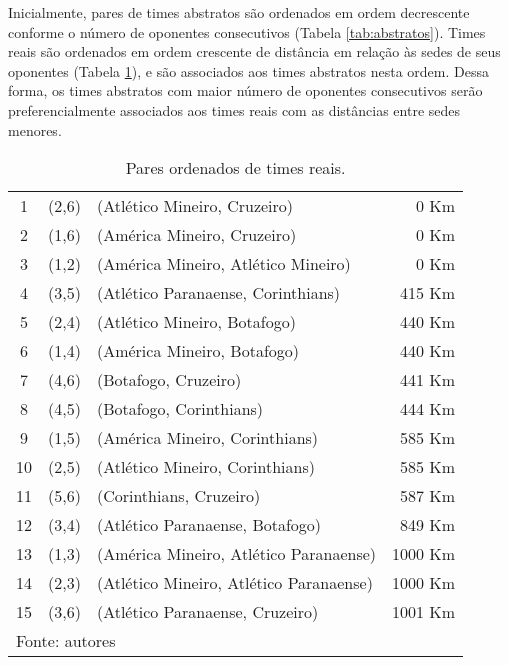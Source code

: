 \documentclass[12pt,a4paper]{article}
\renewcommand*{\arraystretch}{1.2}
\begin{document}
Inicialmente, pares de times abstratos são ordenados em ordem decrescente conforme o número de oponentes consecutivos (Tabela \ref{tab:abstratos}). Times reais são ordenados em ordem crescente de distância em relação às sedes de seus oponentes (Tabela \ref{tab:reais}), e são associados aos times abstratos nesta ordem. Dessa forma, os times abstratos com maior número de oponentes consecutivos serão preferencialmente associados aos times reais com as distâncias entre sedes menores.

\begin{table}[H]
	\renewcommand{\arraystretch}{1}
	\centering
	\caption{Pares ordenados de times reais.}
	\label{tab:reais}
	\begin{tabular}{cclr}
		\toprule
		 1 & (2,6) & (Atlético Mineiro, Cruzeiro) & 0 Km \\
		 2 & (1,6) & (América Mineiro, Cruzeiro) & 0 Km \\
		 3 & (1,2) & (América Mineiro, Atlético Mineiro) & 0 Km \\
		 4 & (3,5) & (Atlético Paranaense, Corinthians) & 415 Km \\
		 5 & (2,4) & (Atlético Mineiro, Botafogo) & 440 Km \\
		 6 & (1,4) & (América Mineiro, Botafogo) & 440 Km \\
		 7 & (4,6) & (Botafogo, Cruzeiro) & 441 Km \\
		 8 & (4,5) & (Botafogo, Corinthians) & 444 Km \\
		 9 & (1,5) & (América Mineiro, Corinthians) & 585 Km \\
		10 & (2,5) & (Atlético Mineiro, Corinthians) & 585 Km \\
		11 & (5,6) & (Corinthians, Cruzeiro) & 587 Km \\
		12 & (3,4) & (Atlético Paranaense, Botafogo) & 849 Km \\
		13 & (1,3) & (América Mineiro, Atlético Paranaense) & 1000 Km \\
		14 & (2,3) & (Atlético Mineiro, Atlético Paranaense) & 1000 Km \\
		15 & (3,6) & (Atlético Paranaense, Cruzeiro) & 1001 Km \\
		\bottomrule
		\multicolumn{4}{l}{\footnotesize Fonte: autores}
	\end{tabular}
\end{table}
\end{document}
